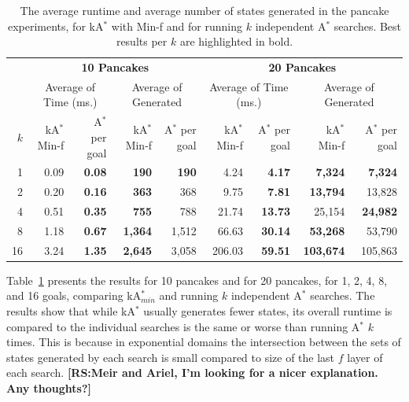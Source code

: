 \documentclass{aicom2e}
\newcommand{\astar}{A$^*$}
\newcommand{\kastar}{kA$^*$}
\newcommand{\kastarmin}{kA$^*_{min}$}
\newcommand{\minf}{Min-f}
\newcommand{\roni}[1]{\textbf{[RS:#1]}}
\begin{document}
\begin{table}[]
	\centering
	\begin{tabular}{r|rr|rr||rr|rr}
		& \multicolumn{4}{c||}{{\bf 10 Pancakes}}                                                           & \multicolumn{4}{c}{{\bf 20 Pancakes}}                                                           \\
		& \multicolumn{2}{c|}{Average of Time (ms.)}   & \multicolumn{2}{c||}{Average of Generated}    & \multicolumn{2}{c|}{Average of Time (ms.)}   & \multicolumn{2}{c}{Average of Generated}    \\\hline
		$k$ & \kastar{} \minf{} & \astar{} per goal & \kastar{} \minf{} & \astar{} per goal & \kastar{} \minf{} & \astar{} per goal & \kastar{} \minf{} & \astar{} per goal \\ \hline
1           & 0.09                  & \textbf{0.08}       & \textbf{190}          & \textbf{190}        & 4.24                  & \textbf{4.17}       & \textbf{7,324}        & \textbf{7,324}      \\
2           & 0.20                  & \textbf{0.16}       & \textbf{363}          & 368                 & 9.75                  & \textbf{7.81}       & \textbf{13,794}       & 13,828              \\
4           & 0.51                  & \textbf{0.35}       & \textbf{755}          & 788                 & 21.74                 & \textbf{13.73}      & 25,154                & \textbf{24,982}     \\
8           & 1.18                  & \textbf{0.67}       & \textbf{1,364}        & 1,512               & 66.63                 & \textbf{30.14}      & \textbf{53,268}       & 53,790              \\
16          & 3.24                  & \textbf{1.35}       & \textbf{2,645}        & 3,058               & 206.03                & \textbf{59.51}      & \textbf{103,674}       & 105,863     
	\end{tabular}
	\caption{The average runtime and average number of states generated in the pancake experiments, for \kastar{} with \minf{} and for running $k$ independent \astar{} searches. Best results per $k$ are highlighted in bold.}
	\label{tab:pancake-minf-k-searches}
\end{table}

Table~\ref{tab:pancake-minf-k-searches} presents the results for 10 pancakes and for 20 pancakes, for 1, 2, 4, 8, and 16 goals, comparing \kastarmin{} and running $k$ independent \astar{} searches. 
The results show that while \kastar{} usually generates fewer states, its overall runtime is compared to the individual searches is the same or worse than running \astar{} $k$ times. This is because in exponential domains the intersection between the sets of states generated by each search is small compared to size of the last $f$ layer of each search. \roni{Meir and Ariel, I'm looking for a nicer explanation. Any thoughts?}
\end{document}
